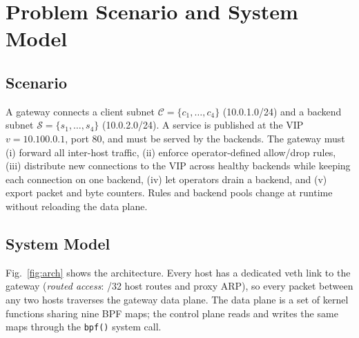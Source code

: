 \documentclass[conference]{IEEEtran}
\begin{document}
\section{Problem Scenario and System Model}
\label{sec:model}
\subsection{Scenario}
A gateway connects a client subnet $\mathcal{C}=\{c_1,\dots,c_4\}$
(10.0.1.0/24) and a backend subnet $\mathcal{S}=\{s_1,\dots,s_4\}$
(10.0.2.0/24). A service is published at the VIP $v=10.100.0.1$, port 80, and
must be served by the backends. The gateway must (i) forward all inter-host
traffic, (ii) enforce operator-defined allow/drop rules, (iii) distribute new
connections to the VIP across healthy backends while keeping each connection
on one backend, (iv) let operators drain a backend, and (v) export packet and
byte counters. Rules and backend pools change at runtime without reloading
the data plane.

\subsection{System Model}
Fig.~\ref{fig:arch} shows the architecture. Every host has a dedicated veth
link to the gateway (\textit{routed access}: /32 host routes and proxy ARP),
so every packet between any two hosts traverses the gateway data plane. The
data plane is a set of kernel functions sharing nine BPF maps; the control
plane reads and writes the same maps through the \texttt{bpf()} system call.
\end{document}
